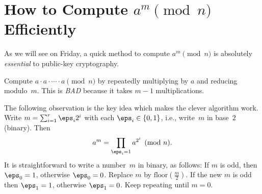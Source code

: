 \documentclass[11pt]{report}
\begin{document}
\section{How to Compute $a^m\pmod{n}$ Efficiently}
As we will see on Friday, a quick method to compute
$a^m\pmod{n}$ is absolutely {\em essential} to
public-key cryptography.

 Compute $a\cdot a \cdot \cdots \cdot a\pmod{n}$ by
repeatedly multiplying by $a$ and reducing modulo~$m$.  This is {\em BAD}
because it takes $m-1$ multiplications.

 The following observation is the key idea which
makes the clever algorithm work.  Write $m=\sum_{i=1}^r \eps_i 2^i$ with
each $\eps_i\in\{0,1\}$, i.e., write~$m$ in base~$2$ (binary).
Then
$$
  a^m  = \prod_{\eps_i = 1} a^{2^i}\pmod{n}.
$$
It is straightforward to write a number~$m$ in binary,
as follows:
{\sf If $m$ is odd, then $\eps_0=1$, otherwise $\eps_0=0$.
Replace $m$ by $\text{floor}({\frac{m}{2}})$.  If the new $m$ is
odd then $\eps_1=1$, otherwise $\eps_1=0$.  Keep repeating
until $m=0$.}
\end{document}
